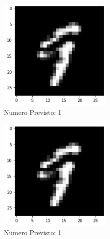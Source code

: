 \documentclass[12pt, a4paper]{article}
\begin{document}
\begin{figure}[H]
    \centering
    \caption{Numero Previsto: 1}
    \includegraphics[width=0.50\textwidth]{nove4.png}
\end{figure}
\begin{figure}[H]
    \centering
    \caption{Numero Previsto: 1}
    \includegraphics[width=0.50\textwidth]{nove5.png}
\end{figure}
\end{document}
